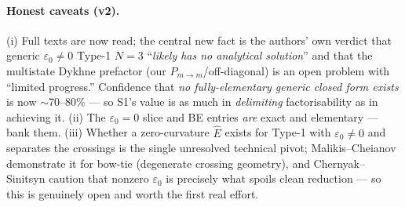\documentclass[11pt]{article}
\newcommand{\eps}{\varepsilon}
\newcommand{\Pmid}{P_{m\to m}}
\begin{document}
\paragraph{Honest caveats (v2).} (i) Full texts are now read; the central new fact is the
authors' own verdict that generic $\eps_0\ne0$ Type-1 $N{=}3$ ``\emph{likely has no analytical
solution}'' and that the multistate Dykhne prefactor (our $\Pmid$/off-diagonal) is an open problem
with ``limited progress.'' Confidence that \emph{no fully-elementary generic closed form exists}
is now $\sim$70--80\% --- so S1's value is as much in \emph{delimiting} factorisability as in
achieving it. (ii) The $\eps_0=0$ slice and BE entries \emph{are} exact and elementary --- bank
them. (iii) Whether a zero-curvature $\hat E$ exists for Type-1 with $\eps_0\ne0$ and separates the
crossings is the single unresolved technical pivot; Malikis--Cheianov demonstrate it for bow-tie
(degenerate crossing geometry), and Chernyak--Sinitsyn caution that nonzero $\eps_0$ is precisely
what spoils clean reduction --- so this is genuinely open and worth the first real effort.
\end{document}
